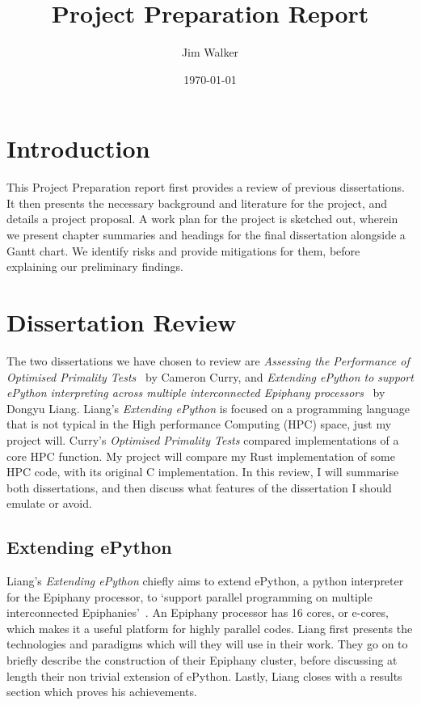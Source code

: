 \documentclass{report}[a4]
\begin{document}
\title{Project Preparation Report}
\author{Jim Walker}
\date{\today}

\makeEPCCtitle

\thispagestyle{empty}

\pagebreak
\tableofcontents
\pagebreak

\chapter{Introduction}
This Project Preparation report first provides a review of previous dissertations. It then presents the necessary background and literature for the project, and details a project proposal. A work plan for the project is sketched out, wherein we present chapter summaries and headings for the final dissertation alongside a Gantt chart. We identify risks and provide mitigations for them, before explaining our preliminary findings.
\chapter{Dissertation Review}
The two dissertations we have chosen to review are \textit{Assessing the Performance of Optimised Primality Tests}~\cite{Curry2016} by Cameron Curry, and \textit{Extending ePython to support ePython interpreting across multiple interconnected Epiphany processors}~\cite{Liang2017} by Dongyu Liang. Liang's \textit{Extending ePython} is focused on a programming language that is not typical in the High performance Computing (HPC) space, just my project will. Curry's \textit{Optimised Primality Tests} compared implementations of a core HPC function. My project will compare my Rust implementation of some HPC code, with its original C implementation. In this review, I will summarise both dissertations, and then discuss what features of the dissertation I should emulate or avoid.
\section{Extending ePython}
Liang's \textit{Extending ePython} chiefly aims to extend ePython, a python interpreter for the Epiphany processor, to `support parallel programming on multiple interconnected Epiphanies'~\cite{Liang2017}. An Epiphany processor has 16 cores, or e-cores, which makes it a useful platform for highly parallel codes. Liang first presents the technologies and paradigms which will they will use in their work. They go on to briefly describe the construction of their Epiphany cluster, before discussing at length their non trivial extension of ePython. Lastly, Liang closes with a results section which proves his achievements.
\end{document}
